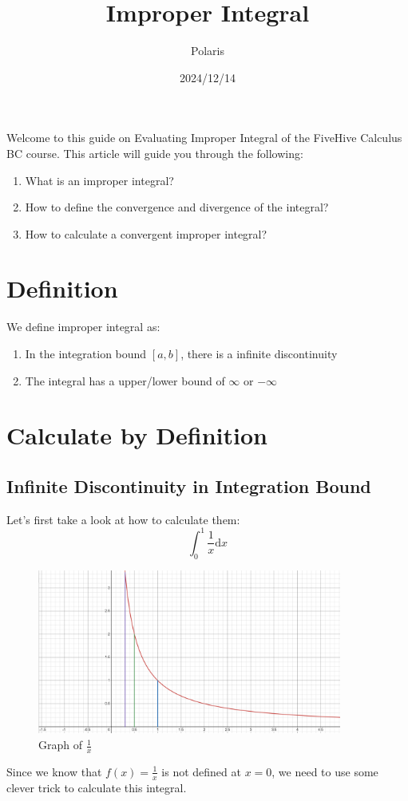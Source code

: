 \documentclass{article}
\title{Improper Integral}
\author{Polaris}
\date{2024/12/14}
\begin{document}
\maketitle

Welcome to this guide on Evaluating Improper Integral of the FiveHive Calculus BC course. This article will guide you through the following:
\begin{enumerate}
    \item What is an improper integral?
    \item How to define the convergence and divergence of the integral?
    \item How to calculate a convergent improper integral?
\end{enumerate}

\section{Definition}
We define improper integral as:
\begin{enumerate}
    \item In the integration bound $[a,b]$, there is a infinite discontinuity
    \item The integral has a upper/lower bound of $\infty$ or $-\infty$
\end{enumerate}

\section{Calculate by Definition}
\subsection{Infinite Discontinuity in Integration Bound}
Let's first take a look at how to calculate them:
\begin{equation}
    \int_0^1 \frac{1}{x}\mathrm{d}x
\end{equation}

\begin{figure}[H]
    \includegraphics[width = 10cm]{pictures/improperintegral1.png}
    \centering
    \caption{Graph of $\frac{1}{x}$}
\end{figure}
Since we know that $f(x) = \frac{1}{x}$ is not defined at $x=0$, we need to use some clever trick to calculate this integral.
\end{document}
